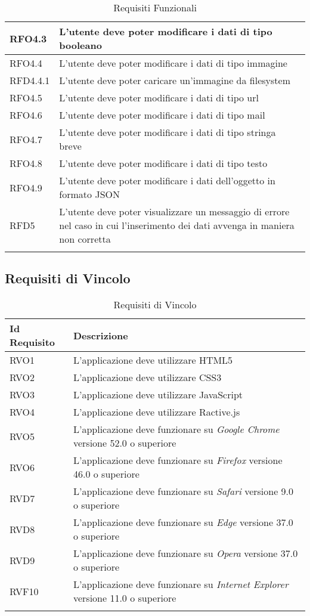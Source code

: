 \begin{longtable}{|l|m{11cm}|}
RFO4.3 & L'utente deve poter modificare i dati di tipo booleano \\ \hline
RFO4.4 & L'utente deve poter modificare i dati di tipo immagine \\ \hline
RFD4.4.1 & L'utente deve poter caricare un'immagine da filesystem \\ \hline
RFO4.5 & L'utente deve poter modificare i dati di tipo url \\ \hline
RFO4.6 & L'utente deve poter modificare i dati di tipo mail \\ \hline
RFO4.7 & L'utente deve poter modificare i dati di tipo stringa breve \\ \hline
RFO4.8 & L'utente deve poter modificare i dati di tipo testo \\ \hline
RFO4.9 & L'utente deve poter modificare i dati dell'oggetto in formato JSON \\ \hline
RFD5 & L'utente deve poter visualizzare un messaggio di errore nel caso in cui l'inserimento dei dati avvenga in maniera non corretta \\ \hline

\caption[Requisiti Funzionali]{Requisiti Funzionali}
\label{tabella:req0}
\end{longtable}
\clearpage
\subsection{Requisiti di Vincolo}
\normalsize
\begin{longtable}{|l|m{11cm}|}
\hline
\textbf{Id Requisito} & \textbf{Descrizione} \\
\hline
\endhead
RVO1 & L'applicazione deve utilizzare HTML5 \\ \hline
RVO2 & L'applicazione deve utilizzare CSS3 \\ \hline
RVO3 & L'applicazione deve utilizzare JavaScript \\ \hline
RVO4 & L'applicazione deve utilizzare Ractive.js \\ \hline
RVO5 & L'applicazione deve funzionare su \textit{Google Chrome} versione 52.0 o superiore \\ \hline
RVO6 & L'applicazione deve funzionare su \textit{Firefox} versione 46.0 o superiore \\ \hline
RVD7 & L'applicazione deve funzionare su \textit{Safari} versione 9.0 o superiore \\ \hline
RVD8 & L'applicazione deve funzionare su \textit{Edge} versione 37.0 o superiore \\ \hline
RVD9 & L'applicazione deve funzionare su \textit{Opera} versione 37.0 o superiore \\ \hline
RVF10 & L'applicazione deve funzionare su \textit{Internet Explorer} versione 11.0 o superiore \\ \hline
\caption[Requisiti di Vincolo]{Requisiti di Vincolo}
\label{tabella:req1}
\end{longtable}
